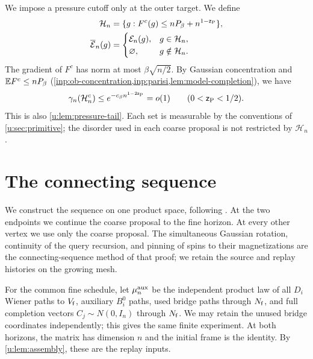 We impose a pressure cutoff only at the outer target. We define
\begin{equation}\label{u:eq:target-pressure-event}
 \begin{split}
 \mathcal H_n&=\{g:F^c(g)\le nP_\beta+n^{1-\mathsf{z}_{\rm P}}\},\\
 \overline{\mathcal E}_n(g)&=
 \begin{cases}
 \mathcal E_n(g),&g\in\mathcal H_n,\\
 \varnothing,&g\notin\mathcal H_n.
 \end{cases}
 \end{split}
\end{equation}
The gradient of $F^c$ has norm at most $\beta\sqrt{n/2}$.
By Gaussian concentration and $\mathbb E F^c\le nP_\beta$
(\cref{inp:ob-concentration,inp:parisi,lem:model-completion}), we have
\begin{equation}\label{u:eq:target-pressure-tail}
 \gamma_n(\mathcal H_n^c)
 \le e^{-c_\beta n^{1-2\mathsf{z}_{\rm P}}}=o(1)
                         \qquad(0<\mathsf{z}_{\rm P}<1/2).
\end{equation}
This is also \cref{u:lem:pressure-tail}. Each set is measurable by the
conventions of \cref{u:sec:primitive}; the disorder used in each coarse
proposal is not restricted by $\mathcal H_n$.

\section{The connecting sequence}\label{u:sec:sequence}

We construct the sequence on one product space, following
\cite[Section~6, Proposition~7]{oai-typical-upper}. At the two endpoints
we continue the coarse proposal to the fine horizon. At every other
vertex we use only the coarse proposal. The simultaneous Gaussian
rotation, continuity of the query recursion, and pinning of spins to
their magnetizations are the connecting-sequence method of that proof;
we retain the source and replay histories on the growing mesh.

For the common fine schedule, let $\mu^{\rm aux}_n$ be the independent
product law of all $D_i$ Wiener paths to $V_{\mathsf{f}}$, auxiliary $B_i^0$
paths, used bridge paths through $N_{\mathsf{f}}$, and full completion vectors
$C_j\sim N(0,I_n)$ through $N_{\mathsf{f}}$. We may retain the unused bridge coordinates independently; this gives
the same finite experiment. At both horizons, the matrix has dimension $n$ and the initial frame is
the identity. By
\cref{u:lem:assembly}, these are the replay inputs.

